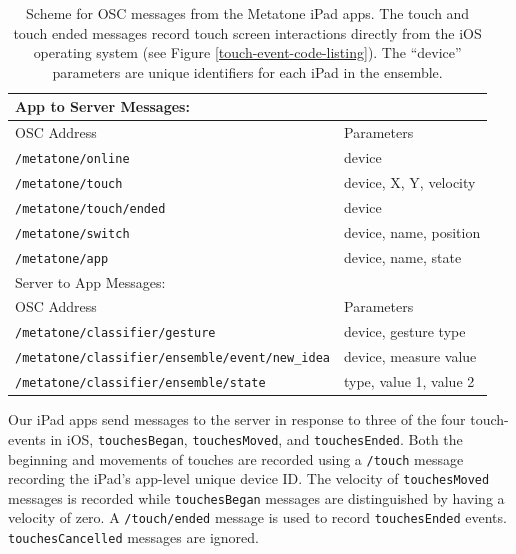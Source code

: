 \documentclass[graybox]{svmult}
\begin{document}
\begin{table}
  \begin{center}
  \begin{tabular}{|l|l|}
  \hline
  App to Server Messages: &\\
  \hline
  OSC Address           & Parameters \\ 
  \hline
  \texttt{/metatone/online}      & device  \\     
  \texttt{/metatone/touch}       & device, X, Y, velocity \\
  \texttt{/metatone/touch/ended} & device \\  
  \texttt{/metatone/switch}      & device, name, position\\
  \texttt{/metatone/app}         & device, name, state\\
  \hline
  Server to App Messages:&\\
  \hline
  OSC Address           & Parameters \\ \hline
  \texttt{/metatone/classifier/gesture} & device, gesture type\\
  \texttt{/metatone/classifier/ensemble/event/new\_idea} & device, measure value\\
  \texttt{/metatone/classifier/ensemble/state} & type, value 1, value 2 \\
  \hline
  \end{tabular}
\end{center}
\caption{Scheme for OSC messages from the Metatone iPad apps. The
  touch and touch ended messages record touch screen interactions
  directly from the iOS operating system (see Figure
  \ref{touch-event-code-listing}). 
  The ``device'' parameters are unique identifiers for each iPad in
  the ensemble.
}
\label{oscschema} 
\end{table}

Our iPad apps send messages to the server in response to three of the
four touch-events in iOS, \texttt{touchesBegan},
\texttt{touchesMoved}, and \texttt{touchesEnded}. Both the beginning
and movements of touches are recorded using a \texttt{/touch} message
recording the iPad's app-level unique device ID. The velocity of
\texttt{touchesMoved} messages is recorded while \texttt{touchesBegan}
messages are distinguished by having a velocity of zero. A
\texttt{/touch/ended} message is used to record \texttt{touchesEnded}
events. \texttt{touchesCancelled} messages are ignored.
 
\end{document}
